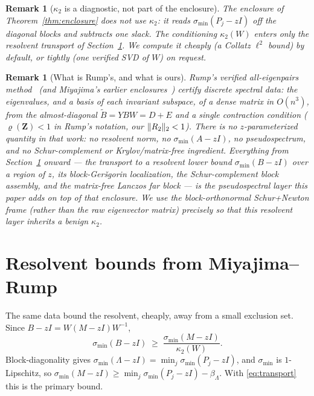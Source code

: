 \documentclass[11pt]{article}
\newtheorem{remark}[theorem]{Remark}
\newcommand{\sigmin}{\sigma_{\min}}
\DeclarePairedDelimiter{\norm}{\lVert}{\rVert}
\begin{document}
\begin{remark}[$\kappa_2$ is a diagnostic, not part of the enclosure]
The enclosure of Theorem~\ref{thm:enclosure} does not use $\kappa_2$: it reads $\sigmin(P_j-zI)$ off
the diagonal blocks and subtracts one slack. The conditioning $\kappa_2(W)$ enters only the
resolvent transport of Section~\ref{sec:mrres}. We compute it cheaply (a Collatz $\ell^2$ bound) by
default, or tightly (one verified SVD of $W$) on request.
\end{remark}

\begin{remark}[What is Rump's, and what is ours]\label{rem:rump}
Rump's verified all-eigenpairs method~\cite{Rump2022} (and Miyajima's earlier
enclosures~\cite{Miyajima2014}) certify \emph{discrete} spectral data: the eigenvalues, and a basis of
each invariant subspace, of a dense matrix in $O(n^3)$, from the almost-diagonal $\widetilde B=YBW=D+E$
and a single contraction condition ($\varrho(\mathbf Z)<1$ in Rump's notation, our $\norm{R_2}_2<1$).
There is no $z$-parameterized quantity in that work: no resolvent norm, no $\sigmin(A-zI)$, no
pseudospectrum, and no Schur-complement or Krylov/matrix-free ingredient. Everything from
Section~\ref{sec:mrres} onward --- the transport to a \emph{resolvent} lower bound
$\sigmin(B-zI)$ over a \emph{region} of $z$, its block-Ger\v sgorin localization, the Schur-complement
block assembly, and the matrix-free Lanczos far block --- is the pseudospectral layer this paper adds
on top of that enclosure. We use the block-orthonormal \emph{Schur}+Newton frame (rather than the raw
eigenvector matrix) precisely so that this resolvent layer inherits a benign $\kappa_2$.
\end{remark}

\section{Resolvent bounds from Miyajima--Rump}\label{sec:mrres}

The same data bound the resolvent, cheaply, away from a small exclusion set. Since
$B-zI=W(M-zI)W^{-1}$,
\begin{equation}\label{eq:transport}
  \sigmin(B-zI)\;\ge\;\frac{\sigmin(M-zI)}{\kappa_2(W)}.
\end{equation}
Block-diagonality gives $\sigmin(\Lambda-zI)=\min_j\sigmin(P_j-zI)$, and $\sigmin$ is $1$-Lipschitz,
so $\sigmin(M-zI)\ge\min_j\sigmin(P_j-zI)-\beta_\Lambda$. With \eqref{eq:transport} this is the
primary bound.
\end{document}
